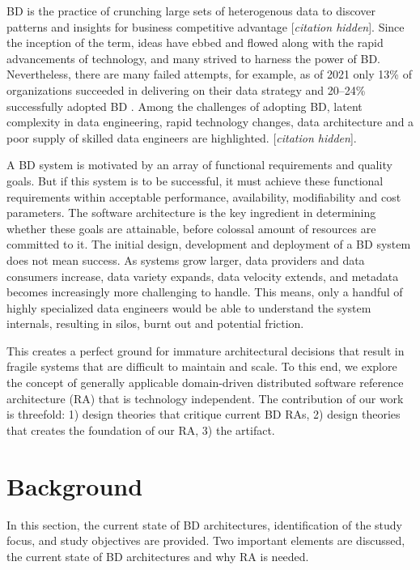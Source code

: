 \documentclass[a4paper,11pt]{article}
\let\cite\citep
\newcommand{\hc}{[\textit{citation hidden}]\textnormal{}}
\begin{document}
BD is the practice of crunching large sets of heterogenous data to discover patterns and insights for business competitive advantage 
\hc{}.
 Since the inception of the term, ideas have ebbed and flowed along with the rapid advancements of technology, and many strived to harness the power of BD. Nevertheless, there are many failed attempts, for example, as of 2021 only 13\%{} of organizations succeeded in delivering on their data strategy \cite{DataBricksSurvey} and 20--24\%{} successfully adopted BD \cite{NewVantageSurvey,GartnerSury}. Among the challenges of adopting BD, latent complexity in data engineering, rapid technology changes, data architecture and a poor supply of skilled data engineers are highlighted. 
\hc{}.  

A BD system is motivated by an array of functional requirements and quality goals. But if this system is to be successful, it must achieve these functional requirements within acceptable performance, availability, modifiability and cost parameters. The software architecture is the key ingredient in determining whether these goals are attainable, before colossal amount of resources are committed to it. The initial design, development and deployment of a BD system does not mean success. As systems grow larger, data providers and data consumers increase, data variety expands, data velocity extends, and metadata becomes increasingly more challenging to handle. This means, only a handful of highly specialized data engineers would be able to understand the system internals, resulting in silos, burnt out and potential friction.

This creates a perfect ground for immature architectural decisions that result in fragile systems that are difficult to maintain and scale. To this end, we explore the concept of generally applicable domain-driven distributed software reference architecture (RA) that is technology independent. The contribution of our work is threefold: 1) design theories that critique current BD RAs, 2) design theories that creates the foundation of our RA, 3) the artifact. 


\section{Background}
In this section, the current state of BD architectures, identification of the study focus, and study objectives are provided. Two important elements are discussed, the current state of BD architectures and why RA is needed.
\end{document}
